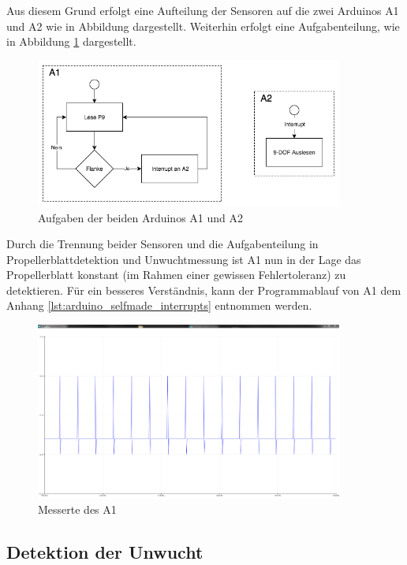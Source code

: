 Aus diesem Grund erfolgt eine Aufteilung der Sensoren auf die zwei Arduinos \ac{A1} und \ac{A2} wie in Abbildung  dargestellt. 
Weiterhin erfolgt eine Aufgabenteilung, wie in Abbildung \ref{fig:aufgaben-arduinos} dargestellt.
\begin{figure}[H]
	\centering
	\includegraphics[width=0.9\textwidth]{images/chapter/03/aufgaben-arduinos.png}
	\caption{Aufgaben der beiden Arduinos \ac{A1} und \ac{A2}}
	\label{fig:aufgaben-arduinos}
\end{figure}
Durch die Trennung beider Sensoren und die Aufgabenteilung in Propellerblattdetektion und Unwuchtmessung ist \ac{A1} nun in der Lage das Propellerblatt konstant (im Rahmen einer gewissen Fehlertoleranz) zu detektieren.
Für ein besseres Verständnis, kann der Programmablauf von \ac{A1} dem Anhang \ref{lst:arduino_selfmade_interrupts} entnommen werden.
\begin{figure}[H]
	\centering
	\includegraphics[width=0.9\textwidth]{images/chapter/03/self_made_interrupt_a1.png}
	\caption{Messerte des \ac{A1}}
	\label{fig:self_made_interrupt_a1}
\end{figure}

\subsection{Detektion der Unwucht}
\label{subsec:detektion_der_unwucht}

